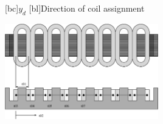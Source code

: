 \begin{psfrags}%
\psfragscanon

[bc]{$y_d$}
[bl]{Direction of coil assignment}


\includegraphics[width=0.5\textwidth]{figs/f_double_layer_type2.eps}
\end{psfrags}%
